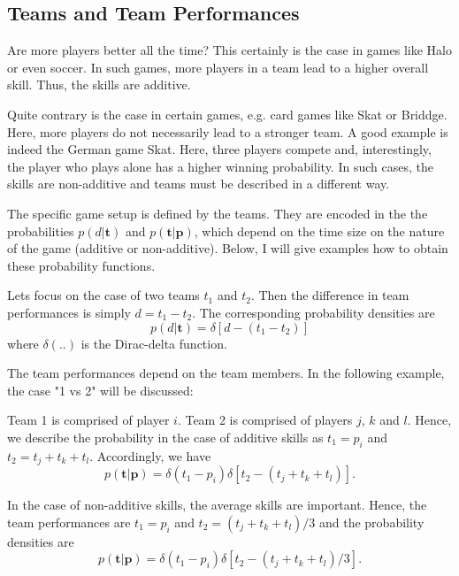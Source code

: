 \documentclass{article}
\begin{document}
\subsection{Teams and Team Performances}

Are more players better all the time? This certainly is the case in games like Halo or even soccer. In such games, more players in a team lead to a higher overall skill. Thus, the skills are additive. 

Quite contrary is the case in certain games, e.g. card games like Skat or Briddge. Here, more players do not necessarily lead to a stronger team. A good example is indeed the German game Skat. Here, three players compete and, interestingly, the player who plays alone has a higher winning probability. In such cases, the skills are non-additive and teams must be described in a different way. 

The specific game setup is defined by the teams. They are encoded in the the probabilities $ p(d | \mathbf{t} )$ and $ p(\mathbf{t} | \mathbf{p} )$, which depend on the time size on the nature of the game (additive or non-additive). Below, I will give examples how to obtain these probability functions. 

Lets focus on the case of two teams $t_1$ and $t_2$. Then the difference in team performances is simply $d = t_1 - t_2$. The corresponding probability densities are
\begin{equation}
p(d | \mathbf{t} ) = \delta[d - (t_1-t_2)]
\end{equation}
where $\delta(..)$ is the Dirac-delta function. 

The team performances depend on the team members. In the following example, the case "1 vs 2" will be discussed:

Team 1 is comprised of player $i$. Team 2 is comprised of players $j$, $k$ and $l$.  Hence, we describe the probability in the case of additive skills as $t_1 = p_i$ and $t_2 = t_j + t_k + t_l$. Accordingly, we have
\begin{equation}
p(\mathbf{t} | \mathbf{p} ) = \delta(t_1 - p_i)\delta[t_2 - (t_j + t_k + t_l)].
\end{equation}

In the case of non-additive skills, the average skills are important. Hence, the team performances are  $t_1 = p_i$ and $t_2 = (t_j + t_k + t_l)/3$ and the probability densities are
\begin{equation}
p(\mathbf{t} | \mathbf{p} ) = \delta(t_1 - p_i)\delta[t_2 - (t_j + t_k + t_l)/3].
\end{equation}
\end{document}
